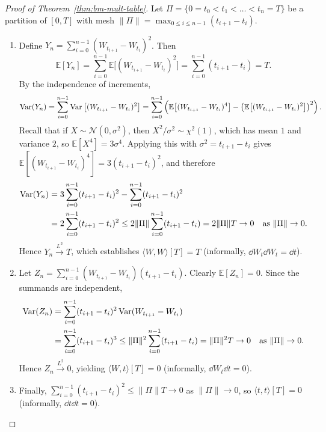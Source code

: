 \begin{proof}[Proof of Theorem~\ref{thm:bm-mult-table}]
Let $\Pi = \{0 = t_0 < t_1 < \dots < t_n = T\}$ be a partition of $[0, T]$ with mesh $\|\Pi\| = \max_{0 \le i \le n-1}(t_{i+1} - t_i)$.
\begin{enumerate}
    \item Define $Y_n = \sum_{i=0}^{n-1} (W_{t_{i+1}} - W_{t_i})^2$. Then
    \[
    \mathbb{E}[Y_n] = \sum_{i=0}^{n-1} \mathbb{E}\big[(W_{t_{i+1}} - W_{t_i})^2\big] = \sum_{i=0}^{n-1} (t_{i+1} - t_i) = T.
    \]
    By the independence of increments,
    \[
    \operatorname{Var}(Y_n) = \sum_{i=0}^{n-1} \operatorname{Var}\big[(W_{t_{i+1}} - W_{t_i})^2\big] = \sum_{i=0}^{n-1} \left( \mathbb{E}\big[(W_{t_{i+1}} - W_{t_i})^4\big] - \left(\mathbb{E}\big[(W_{t_{i+1}} - W_{t_i})^2\big]\right)^2 \right).
    \]
    Recall that if $X \sim \mathcal{N}(0, \sigma^2)$, then $X^2 / \sigma^2 \sim \chi^2(1)$, which has mean $1$ and variance $2$, so $\mathbb{E}[X^4] = 3\sigma^4$. Applying this with $\sigma^2 = t_{i+1} - t_i$ gives $\mathbb{E}[(W_{t_{i+1}} - W_{t_i})^4] = 3(t_{i+1} - t_i)^2$, and therefore
    \begin{align*}
    \operatorname{Var}(Y_n)
    &= 3 \sum_{i=0}^{n-1} (t_{i+1} - t_i)^2 - \sum_{i=0}^{n-1} (t_{i+1} - t_i)^2 \\
    &= 2 \sum_{i=0}^{n-1} (t_{i+1} - t_i)^2 \le 2 \|\Pi\| \sum_{i=0}^{n-1} (t_{i+1} - t_i) = 2 \|\Pi\| T \to 0 \quad \text{as } \|\Pi\| \to 0.
    \end{align*}
    Hence $Y_n \xrightarrow{L^2} T$, which establishes $\langle W, W \rangle[T] = T$ (informally, $\dd W_t \dd W_t = \dd t$).

    \item Let $Z_n = \sum_{i=0}^{n-1} (W_{t_{i+1}} - W_{t_i})(t_{i+1} - t_i)$. Clearly $\mathbb{E}[Z_n] = 0$. Since the summands are independent,
    \begin{align*}
    \operatorname{Var}(Z_n)
    &= \sum_{i=0}^{n-1} (t_{i+1} - t_i)^2 \operatorname{Var}(W_{t_{i+1}} - W_{t_i}) \\
    &= \sum_{i=0}^{n-1} (t_{i+1} - t_i)^3 \le \|\Pi\|^2 \sum_{i=0}^{n-1} (t_{i+1} - t_i) = \|\Pi\|^2 T \to 0 \quad \text{as } \|\Pi\| \to 0.
    \end{align*}
    Hence $Z_n \xrightarrow{L^2} 0$, yielding $\langle W, t \rangle[T] = 0$ (informally, $\dd W_t \dd t = 0$).

    \item Finally, $\sum_{i=0}^{n-1} (t_{i+1} - t_i)^2 \le \|\Pi\| T \to 0$ as $\|\Pi\| \to 0$, so $\langle t, t \rangle[T] = 0$ (informally, $\dd t \dd t = 0$). \qedhere
\end{enumerate}
\end{proof}

